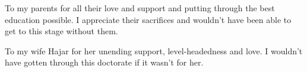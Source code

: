 
\begin{dedication} 

To my parents for all their love and support and putting through the best education possible. I
appreciate their sacrifices and wouldn't have been able to get to this stage without them.

To my wife Hajar for her unending support, level-headedness and love. I wouldn't have gotten through
this doctorate if it wasn't for her.

\end{dedication}

